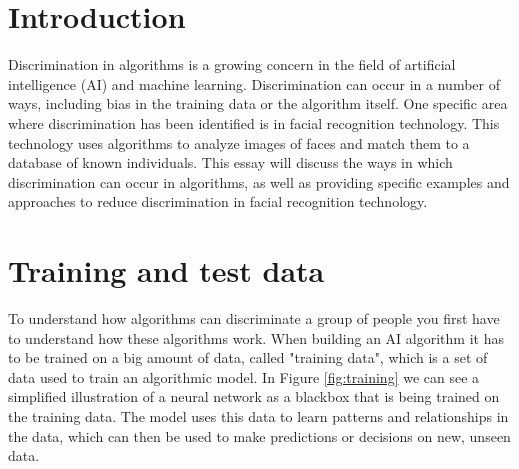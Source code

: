 \documentclass[
	12pt,
    a4paper,
    egregdoesnotlikesansseriftitles, %
    toc=chapterentrywithdots,
    oneside, openany,
    titlepage,
    parskip=half,
    headings=normal,  %
    listof=totoc,
    bibliography=totocnumbered,
    index=totoc,
    captions=tableheading,  %
    listof=flat,
    numbers=noenddot, %
    final]
    {scrbook}
\begin{document}
\setcounter{secnumdepth}{3}  %
\setcounter{tocdepth}{2}  %


\frontmatter


\tableofcontents

\listoffigures
\clearpage %


\renewcommand{\lstlistlistingname}{List of Listings}  %
\clearpage %

\mainmatter

\chapter{Introduction}
Discrimination in algorithms is a growing concern in the field of artificial intelligence (AI) and machine learning. 
Discrimination can occur in a number of ways, including bias in the training data or the algorithm itself. 
One specific area where discrimination has been identified is in facial recognition technology. This technology uses algorithms to analyze images of faces and match them to a database of known individuals.
This essay will discuss the ways in which discrimination can occur in algorithms, as well as providing specific examples and approaches to reduce discrimination in facial recognition technology.

\chapter{Training and test data}
To understand how algorithms can discriminate a group of people you first have to understand how these algorithms work. 
When building an AI algorithm it has to be trained on a big amount of data, called "training data", which is a set of data used to train an algorithmic model.
In Figure \ref{fig:training} we can see a simplified illustration of a neural network as a blackbox that is being trained on the training data. 
The model uses this data to learn patterns and relationships in the data, which can then be used to make predictions or decisions on new, unseen data.
\end{document}
